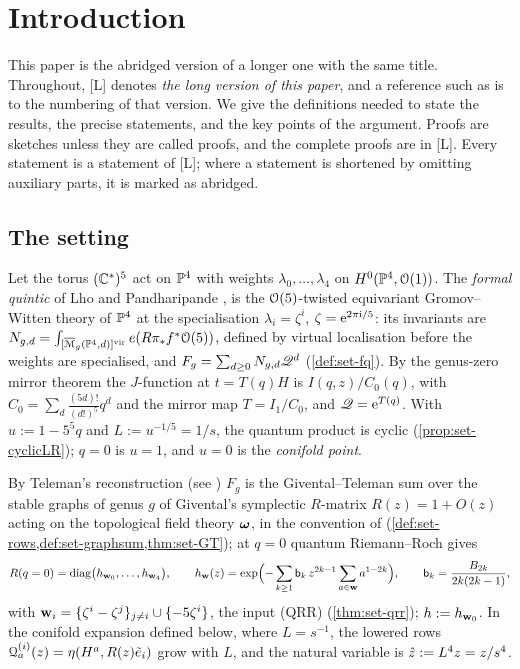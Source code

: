 \section{Introduction}
\label{sec:int}

This paper is the abridged version of a longer one with the same title. Throughout, [L] denotes \emph{the long version of this paper}, and a reference such as  is to the numbering of that version. We give the definitions needed to state the results, the precise statements, and the key points of the argument. Proofs are sketches unless they are called proofs, and the complete proofs are in [L]. Every statement is a statement of [L]; where a statement is shortened by omitting auxiliary parts, it is marked as abridged.

\subsection{The setting}
\label{sec:int-setting}

Let the torus $(\mathbb{C}^*)^5$ act on $\mathbb{P}^4$ with weights $\lambda_0,\dots,\lambda_4$ on $H^0(\mathbb{P}^4,\mathcal{O}(1))$. The \emph{formal quintic} of Lho and Pandharipande \cite[\S0.2, (5)]{LP18}, \cite[\S0.2, (5)]{LP20} is the $\mathcal{O}(5)$-twisted equivariant Gromov--Witten theory of $\mathbb{P}^4$ at the specialisation $\lambda_i=\zeta^i$, $\zeta=\mathrm{e}^{2\pi\mathrm{i}/5}$: its invariants are $N_{g,d}=\int_{[\overline{\mathcal M}_g(\mathbb{P}^4,d)]^{\mathrm{vir}}}e(R\pi_*f^*\mathcal{O}(5))$, defined by virtual localisation \cite{MR1666787} before the weights are specialised, and $F_g=\sum_{d\geq0}N_{g,d}\mathscr{Q}^d$ (\cref{def:set-fq}). By the genus-zero mirror theorem the $J$-function at $t=T(q)H$ is $I(q,z)/C_0(q)$, with $C_0=\sum_d\frac{(5d)!}{(d!)^5}q^d$ and the mirror map $T=I_1/C_0$, and $\mathscr{Q}=\mathrm{e}^{T(q)}$. With $u:=1-5^5q$ and $L:=u^{-1/5}=1/s$, the quantum product is cyclic (\cref{prop:set-cyclicLR}); $q=0$ is $u=1$, and $u=0$ is the \emph{conifold point}.

By Teleman's reconstruction \cite[Theorem~(2) in (1.15)]{MR2917177} (see \cite[\S4.1, Theorem~4.1]{GJR18}) $F_g$ is the Givental--Teleman sum over the stable graphs of genus $g$ of Givental's symplectic $R$-matrix $R(z)=1+O(z)$ acting on the topological field theory $\boldsymbol{\omega}$, in the convention of \cite[Defs.~2.2, 2.13]{PPZ15} (\cref{def:set-rows,def:set-graphsum,thm:set-GT}); at $q=0$ quantum Riemann--Roch \cite[(17)]{GJR18} gives
\[
R(q=0)=\operatorname{diag}\bigl(h_{\mathbf{w}_0},\dots,h_{\mathbf{w}_4}\bigr),\qquad h_{\mathbf{w}}(z)=\exp\Bigl(-\sum_{k\geq1}\mathsf{b}_k\,z^{2k-1}\sum_{a\in\mathbf{w}}a^{1-2k}\Bigr),\qquad \mathsf{b}_k=\frac{B_{2k}}{2k(2k-1)},
\]
with $\mathbf{w}_i=\{\zeta^i-\zeta^j\}_{j\neq i}\cup\{-5\zeta^i\}$, the input (QRR) (\cref{thm:set-qrr}); $h:=h_{\mathbf{w}_0}$. In the conifold expansion defined below, where $L=s^{-1}$, the lowered rows $\mathcal{Q}^{(i)}_a(z)=\eta(H^a,R(z)\tilde e_i)$ grow with $L$, and the natural variable is $\hat{z}:=L^4z=z/s^4$.

